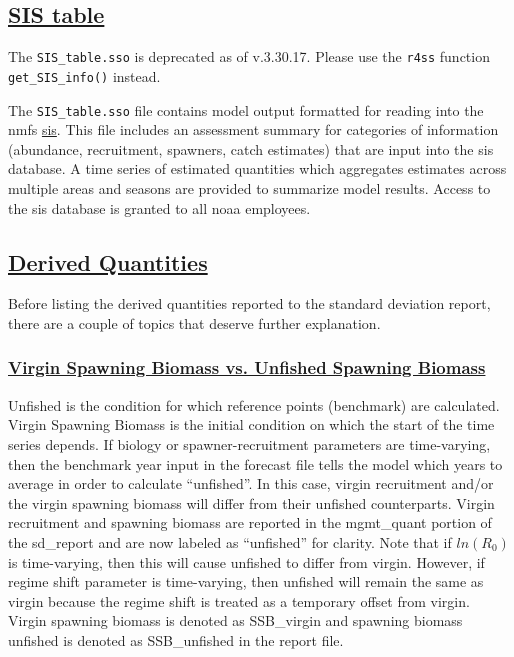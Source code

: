 \hypertarget{SIStable}{}
\subsection[SIS table]{\protect\hyperlink{SIStable}{SIS table}}
The \texttt{SIS\_table.sso} is deprecated as of v.3.30.17. Please use the \texttt{r4ss} function \texttt{get\_SIS\_info()} instead. 

The \texttt{SIS\_table.sso} file contains model output formatted for reading into the \gls{nmfs} \href{https://www.st.nmfs.noaa.gov/sis/}{\gls{sis}}. This file includes an assessment summary for categories of information (abundance, recruitment, spawners, catch estimates) that are input into the \gls{sis} database. A time series of estimated quantities which aggregates estimates across multiple areas and seasons are provided to summarize model results. Access to the \gls{sis} database is granted to all \gls{noaa} employees.

\hypertarget{DerivedQuant}{}
\subsection[Derived Quantities]{\protect\hyperlink{DerivedQuant}{Derived Quantities}}
Before listing the derived quantities reported to the standard deviation report, there are a couple of topics that deserve further explanation.

\hypertarget{VirginUnfished}{}
\subsubsection[Virgin Spawning Biomass vs. Unfished Spawning Biomass]{\protect\hyperlink{VirginUnfished}{Virgin Spawning Biomass vs. Unfished Spawning Biomass}}
Unfished is the condition for which reference points (benchmark) are calculated. Virgin Spawning Biomass is the initial condition on which the start of the time series depends. If biology or spawner-recruitment parameters are time-varying, then the benchmark year input in the forecast file tells the model which years to average in order to calculate ``unfished''. In this case, virgin recruitment and/or the virgin spawning biomass will differ from their unfished counterparts. Virgin recruitment and spawning biomass are reported in the mgmt\_quant portion of the sd\_report and are now labeled as ``unfished'' for clarity. Note that if $ln(R_{0})$ is time-varying, then this will cause unfished to differ from virgin. However, if regime shift parameter is time-varying, then unfished will remain the same as virgin because the regime shift is treated as a temporary offset from virgin. Virgin spawning biomass is denoted as SSB\_virgin and spawning biomass unfished is denoted as SSB\_unfished in the report file.

